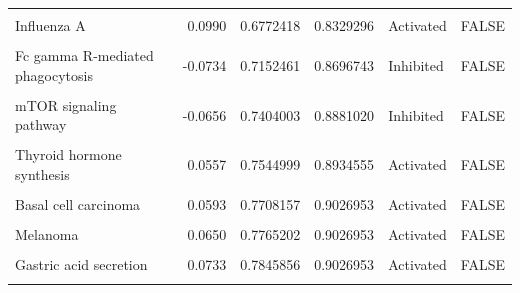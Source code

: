 \documentclass[9pt,a4paper,]{extarticle}
\begin{document}
\begin{table}
{\begin{tabular}[t]{lrrrll}
\cellcolor{gray!6}{Bile secretion} & \cellcolor{gray!6}{-0.1068} & \cellcolor{gray!6}{0.6636205} & \cellcolor{gray!6}{0.8208947} & \cellcolor{gray!6}{Inhibited} & \cellcolor{gray!6}{FALSE}\\
Influenza A & 0.0990 & 0.6772418 & 0.8329296 & Activated & FALSE\\
\cellcolor{gray!6}{Hepatitis B} & \cellcolor{gray!6}{-0.0834} & \cellcolor{gray!6}{0.7030350} & \cellcolor{gray!6}{0.8597114} & \cellcolor{gray!6}{Inhibited} & \cellcolor{gray!6}{FALSE}\\
\addlinespace
Fc gamma R-mediated phagocytosis & -0.0734 & 0.7152461 & 0.8696743 & Inhibited & FALSE\\
\cellcolor{gray!6}{Thyroid hormone signaling pathway} & \cellcolor{gray!6}{-0.0777} & \cellcolor{gray!6}{0.7207121} & \cellcolor{gray!6}{0.8713695} & \cellcolor{gray!6}{Inhibited} & \cellcolor{gray!6}{FALSE}\\
mTOR signaling pathway & -0.0656 & 0.7404003 & 0.8881020 & Inhibited & FALSE\\
\cellcolor{gray!6}{Focal adhesion} & \cellcolor{gray!6}{-0.0689} & \cellcolor{gray!6}{0.7428517} & \cellcolor{gray!6}{0.8881020} & \cellcolor{gray!6}{Inhibited} & \cellcolor{gray!6}{FALSE}\\
Thyroid hormone synthesis & 0.0557 & 0.7544999 & 0.8934555 & Activated & FALSE\\
\addlinespace
\cellcolor{gray!6}{Insulin resistance} & \cellcolor{gray!6}{-0.0616} & \cellcolor{gray!6}{0.7556797} & \cellcolor{gray!6}{0.8934555} & \cellcolor{gray!6}{Inhibited} & \cellcolor{gray!6}{FALSE}\\
Basal cell carcinoma & 0.0593 & 0.7708157 & 0.9026953 & Activated & FALSE\\
\cellcolor{gray!6}{ECM-receptor interaction} & \cellcolor{gray!6}{0.0613} & \cellcolor{gray!6}{0.7730239} & \cellcolor{gray!6}{0.9026953} & \cellcolor{gray!6}{Activated} & \cellcolor{gray!6}{FALSE}\\
Melanoma & 0.0650 & 0.7765202 & 0.9026953 & Activated & FALSE\\
\cellcolor{gray!6}{Sulfur relay system} & \cellcolor{gray!6}{-0.0568} & \cellcolor{gray!6}{0.7825883} & \cellcolor{gray!6}{0.9026953} & \cellcolor{gray!6}{Inhibited} & \cellcolor{gray!6}{FALSE}\\
\addlinespace
Gastric acid secretion & 0.0733 & 0.7845856 & 0.9026953 & Activated & FALSE\\
\cellcolor{gray!6}{Breast cancer} & \cellcolor{gray!6}{0.0400} & \cellcolor{gray!6}{0.7914267} & \cellcolor{gray!6}{0.9056969} & \cellcolor{gray!6}{Activated} & \cellcolor{gray!6}{FALSE}\\

\end{tabular}}
\end{table}
\end{document}
